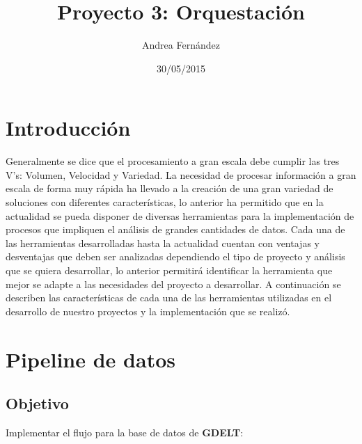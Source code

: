 \documentclass[]{article}
\title{Proyecto 3: Orquestación}
\author{Andrea Fernández}
\date{30/05/2015}
\begin{document}
\maketitle


{
\hypersetup{linkcolor=black}
\setcounter{tocdepth}{3}
\tableofcontents
}
\pagebreak

\section{Introducción}\label{introduccion}

Generalmente se dice que el procesamiento a gran escala debe cumplir las
tres V's: Volumen, Velocidad y Variedad. La necesidad de procesar
información a gran escala de forma muy rápida ha llevado a la creación
de una gran variedad de soluciones con diferentes características, lo
anterior ha permitido que en la actualidad se pueda disponer de diversas
herramientas para la implementación de procesos que impliquen el
análisis de grandes cantidades de datos. Cada una de las herramientas
desarrolladas hasta la actualidad cuentan con ventajas y desventajas que
deben ser analizadas dependiendo el tipo de proyecto y análisis que se
quiera desarrollar, lo anterior permitirá identificar la herramienta que
mejor se adapte a las necesidades del proyecto a desarrollar. A
continuación se describen las características de cada una de las
herramientas utilizadas en el desarrollo de nuestro proyectos y la
implementación que se realizó.

\section{Pipeline de datos}\label{pipeline-de-datos}

\subsection{Objetivo}\label{objetivo}

Implementar el flujo para la base de datos de \textbf{GDELT}:
\end{document}
